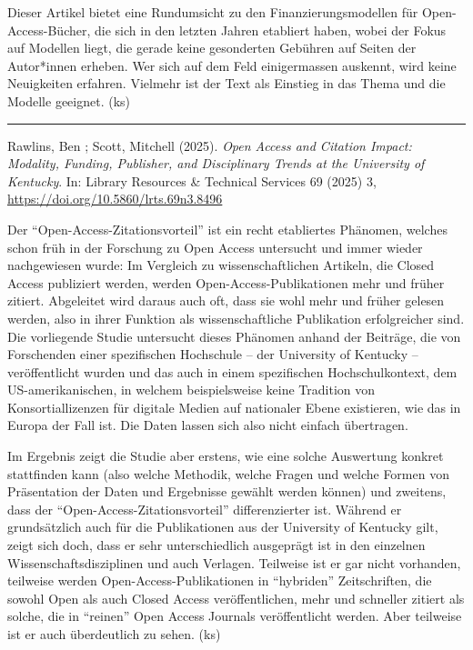 \documentclass[a4paper,
fontsize=11pt,
oneside,
numbers=noperiodatend,
parskip=half-,
bibliography=totoc,
final
]{scrartcl}
\begin{document}
Dieser Artikel bietet eine Rundumsicht zu den Finanzierungsmodellen für
Open-Access-Bücher, die sich in den letzten Jahren etabliert haben,
wobei der Fokus auf Modellen liegt, die gerade keine gesonderten
Gebühren auf Seiten der Autor*innen erheben. Wer sich auf dem Feld
einigermassen auskennt, wird keine Neuigkeiten erfahren. Vielmehr ist
der Text als Einstieg in das Thema und die Modelle geeignet. (ks)

\begin{center}\rule{0.5\linewidth}{0.5pt}\end{center}

Rawlins, Ben ; Scott, Mitchell (2025). \emph{Open Access and Citation
Impact: Modality, Funding, Publisher, and Disciplinary Trends at the
University of Kentucky}. In: Library Resources \& Technical Services 69
(2025) 3, \url{https://doi.org/10.5860/lrts.69n3.8496}

Der \enquote{Open-Access-Zitationsvorteil} ist ein recht etabliertes
Phänomen, welches schon früh in der Forschung zu Open Access untersucht
und immer wieder nachgewiesen wurde: Im Vergleich zu wissenschaftlichen
Artikeln, die Closed Access publiziert werden, werden
Open-Access-Publikationen mehr und früher zitiert. Abgeleitet wird
daraus auch oft, dass sie wohl mehr und früher gelesen werden, also in
ihrer Funktion als wissenschaftliche Publikation erfolgreicher sind. Die
vorliegende Studie untersucht dieses Phänomen anhand der Beiträge, die
von Forschenden einer spezifischen Hochschule -- der University of
Kentucky -- veröffentlicht wurden und das auch in einem spezifischen
Hochschulkontext, dem US-amerikanischen, in welchem beispielsweise keine
Tradition von Konsortiallizenzen für digitale Medien auf nationaler
Ebene existieren, wie das in Europa der Fall ist. Die Daten lassen sich
also nicht einfach übertragen.

Im Ergebnis zeigt die Studie aber erstens, wie eine solche Auswertung
konkret stattfinden kann (also welche Methodik, welche Fragen und welche
Formen von Präsentation der Daten und Ergebnisse gewählt werden können)
und zweitens, dass der \enquote{Open-Access-Zitationsvorteil}
differenzierter ist. Während er grundsätzlich auch für die Publikationen
aus der University of Kentucky gilt, zeigt sich doch, dass er sehr
unterschiedlich ausgeprägt ist in den einzelnen Wissenschaftsdisziplinen
und auch Verlagen. Teilweise ist er gar nicht vorhanden, teilweise
werden Open-Access-Publikationen in \enquote{hybriden} Zeitschriften,
die sowohl Open als auch Closed Access veröffentlichen, mehr und
schneller zitiert als solche, die in \enquote{reinen} Open Access
Journals veröffentlicht werden. Aber teilweise ist er auch überdeutlich
zu sehen. (ks)
\end{document}
